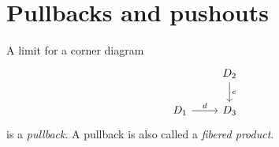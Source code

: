 \documentclass[article, a4paper, 11pt, oneside]{memoir}
\numberwithin{equation}{chapter}
\theoremstyle{myexample}
\theoremstyle{myexamplebreak}
\begin{document}
\chapter{Pullbacks and pushouts}

\begin{definition}[Pullbacks]
    A limit for a corner diagram
    \begin{equation*}
        \begin{tikzcd}
            & D_2
                \ar[d, "e"]
            \\
            D_1
                \ar[r, "d"]
            & D_3
        \end{tikzcd}
    \end{equation*}
    is a \emph{pullback}. A pullback is also called a \emph{fibered product}.
\end{definition}
\end{document}
